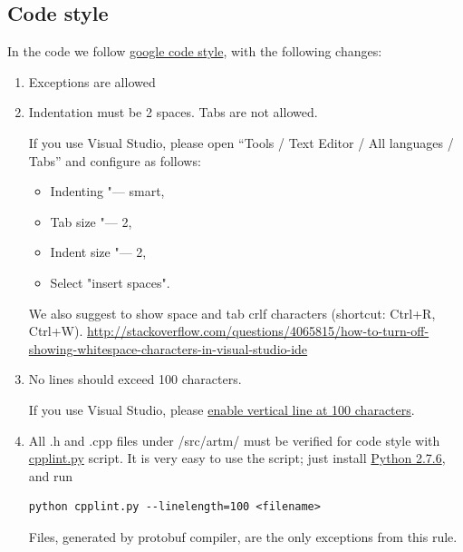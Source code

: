 \documentclass[11pt,a4paper,twoside]{report}
\begin{document}
\subsection{Code style}
\label{label:code_style}
In the code we follow
\href{http://google-styleguide.googlecode.com/svn/trunk/cppguide.xml}{google code style},
with the following changes:
\begin{enumerate}
    \item Exceptions are allowed
    \item Indentation must be 2 spaces. Tabs are not allowed.

      If you use Visual Studio,
      please open ``Tools / Text Editor / All languages / Tabs''
      and configure as follows:
      \begin{itemize}
          \item Indenting "--- smart,
          \item Tab size "--- 2,
          \item Indent size "--- 2,
          \item Select "insert spaces".
      \end{itemize}

      We also suggest to show space and tab crlf characters (shortcut: Ctrl+R, Ctrl+W).
      \url{http://stackoverflow.com/questions/4065815/how-to-turn-off-showing-whitespace-characters-in-visual-studio-ide}

\item No lines should exceed 100 characters.

      If you use Visual Studio, please \href{http://stackoverflow.com/questions/9894397/100-characters-line-marker-in-visual-studio}{enable
       vertical line at 100 characters}.

\item All .h and .cpp files under /src/artm/ must be verified for code style with
      \href{http://google-styleguide.googlecode.com/svn/trunk/cpplint/cpplint.py}{cpplint.py} script.
      It is very easy to use the script; just install
      \href{http://www.python.org/downloads/}{Python 2.7.6}, and run

\begin{verbatim}
python cpplint.py --linelength=100 <filename>
\end{verbatim}
      Files, generated by protobuf compiler, are the only exceptions from this rule.

\end{enumerate}
\end{document}
